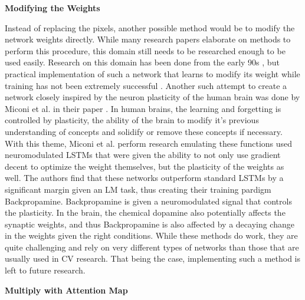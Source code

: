 

\textbf{Modifying the Weights}

Instead of replacing the pixels, another possible method would be to modify the network weights directly. While many research papers elaborate on methods to perform this procedure, this domain still needs to be researched enough to be used easily. Research on this domain has been done from the early 90s \cite{schmidhuberSelfReferentialWeightMatrix1993}, but practical implementation of such a network that learns to modify its weight while training has not been extremely successful \cite{irieModernSelfReferentialWeight2022}. 
Another such attempt to create a network closely inspired by the neuron plasticity of the human brain was done by Miconi et al. in their paper \cite{miconiBackpropamineTrainingSelfmodifying2020}. In human brains, the learning and forgetting is controlled by plasticity, the ability of the brain to modify it's previous understanding of concepts and solidify or remove these concepts if necessary. With this theme, Miconi et al. perform research emulating these functions used neuromodulated LSTMs that were given the ability to not only use gradient decent to optimize the weight themselves, but the plasticity of the weights as well. The authors find that these networks outperform standard LSTMs by a significant margin given an LM task, thus creating their training pardigm Backpropamine. Backpropamine is given a neuromodulated signal that controls the plasticity. In the brain, the chemical dopamine also potentially affects the synaptic weights, and thus Backpropamine is also affected by a decaying change in the weights given the right conditions.
While these methods do work, they are quite challenging and rely on very different types of networks than those that are usually used in CV research. That being the case, implementing such a method is left to future research.

\textbf{Multiply with Attention Map}

